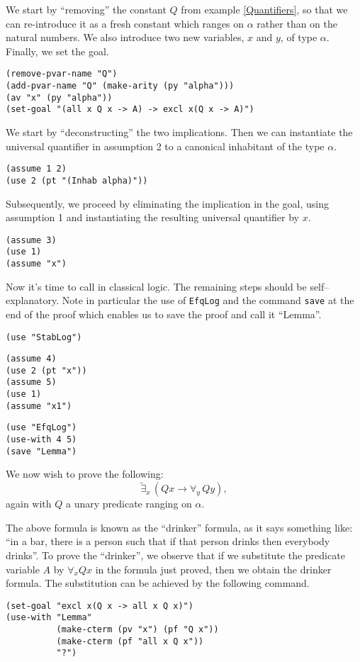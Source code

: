 \documentclass[12pt]{amsart}
\newcommand{\excl}{\tilde{\exists}} %
\newcommand{\inquotes}[1]{``#1''}
\newcommand{\ob}{\to}
\begin{document}
We start by \inquotes{removing} the constant $Q$ from example
\ref{Quantifiers}, so that we can re-introduce it as a fresh constant
which ranges on $\alpha$ rather than on the natural numbers. We also
introduce two new variables, $x$ and $y$, of type $\alpha$. Finally,
we set the goal.
\begin{verbatim}
(remove-pvar-name "Q")
(add-pvar-name "Q" (make-arity (py "alpha")))
(av "x" (py "alpha"))
(set-goal "(all x Q x -> A) -> excl x(Q x -> A)")
\end{verbatim}

We start by \inquotes{deconstructing} the two implications.  Then we
can instantiate the universal quantifier in assumption 2 to a
canonical inhabitant of the type $\alpha$.
\begin{verbatim}
(assume 1 2)
(use 2 (pt "(Inhab alpha)"))
\end{verbatim}

Subsequently, we proceed by eliminating the implication in the goal,
using assumption 1 and instantiating the resulting universal
quantifier by $x$.
\begin{verbatim}
(assume 3)
(use 1)
(assume "x")
\end{verbatim}

Now it's time to call in classical logic.  The remaining steps should
be self--explanatory.  Note in particular the use of \texttt{EfqLog}
and the command \texttt{save} at the end of the proof which enables us
to save the proof and call it \inquotes{Lemma}.
\begin{verbatim}
(use "StabLog")
\end{verbatim}

\begin{verbatim}
(assume 4)
(use 2 (pt "x"))
(assume 5)
(use 1)
(assume "x1")
\end{verbatim}

\begin{verbatim}
(use "EfqLog")
(use-with 4 5)
(save "Lemma")
\end{verbatim}

We now wish to prove the following:
\begin{equation*}
  \excl_x\, (Q x \ob \forall_y\, Q y),
\end{equation*}
again with $Q$ a unary predicate ranging on $\alpha$.

The above formula is known as the \inquotes{drinker} formula, as it
says something like: \inquotes{in a bar, there is a person such that
  if that person drinks then everybody drinks}.  To prove the
\inquotes{drinker}, we observe that if we substitute the predicate
variable $A$ by $\forall_x Q x$ in the formula just proved, then we
obtain the drinker formula.  The substitution can be achieved by the
following command.
\begin{verbatim}
(set-goal "excl x(Q x -> all x Q x)")
(use-with "Lemma"
          (make-cterm (pv "x") (pf "Q x"))
          (make-cterm (pf "all x Q x"))
          "?")
\end{verbatim}
\end{document}
